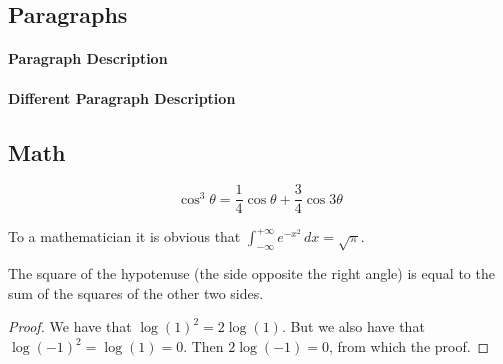 \documentclass[
10pt, %
letterpaper, %
oneside, %
headinclude,footinclude, %
BCOR5mm, %
]{article}
\begin{document}

\subsection{Paragraphs}


\paragraph{Paragraph Description} %

\paragraph{Different Paragraph Description} %


\subsection{Math}


\begin{equation}
\cos^3 \theta =\frac{1}{4}\cos\theta+\frac{3}{4}\cos 3\theta
\label{eq:refname2}
\end{equation}


\begin{definition}[Gauss] 
To a mathematician it is obvious that
$\int_{-\infty}^{+\infty}
e^{-x^2}\,dx=\sqrt{\pi}$. 
\end{definition} 

\begin{theorem}[Pythagoras]
The square of the hypotenuse (the side opposite the right angle) is equal to the sum of the squares of the other two sides.
\end{theorem}

\begin{proof} 
We have that $\log(1)^2 = 2\log(1)$.
But we also have that $\log(-1)^2=\log(1)=0$.
Then $2\log(-1)=0$, from which the proof.
\end{proof}

\end{document}
